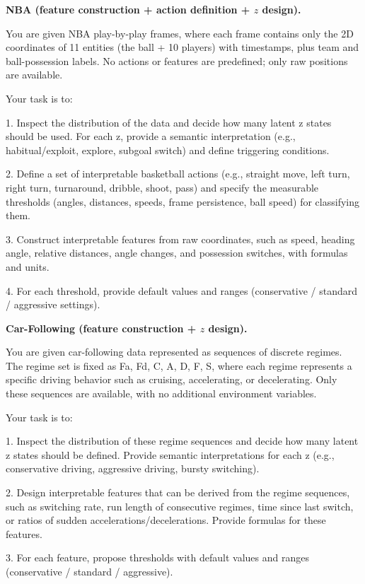 \documentclass{article} %
\begin{document}
\noindent\textbf{NBA (feature construction + action definition + $z$ design).}\\[-0.3em]
\begin{PromptBox}
You are given NBA play-by-play frames, where each frame contains only the 2D
coordinates of 11 entities (the ball + 10 players) with timestamps, plus team and
ball-possession labels. No actions or features are predefined; only raw positions
are available.

Your task is to:

1. Inspect the distribution of the data and decide how many latent z states
   should be used. For each z, provide a semantic interpretation (e.g.,
   habitual/exploit, explore, subgoal switch) and define triggering conditions.

2. Define a set of interpretable basketball actions (e.g., straight move, left turn,
   right turn, turnaround, dribble, shoot, pass) and specify the measurable
   thresholds (angles, distances, speeds, frame persistence, ball speed) for
   classifying them.

3. Construct interpretable features from raw coordinates, such as speed, heading
   angle, relative distances, angle changes, and possession switches, with formulas
   and units.

4. For each threshold, provide default values and ranges
   (conservative / standard / aggressive settings).
\end{PromptBox}

\noindent\textbf{Car-Following (feature construction + $z$ design).}\\[-0.3em]
\begin{PromptBox}
You are given car-following data represented as sequences of discrete regimes.
The regime set is fixed as {Fa, Fd, C, A, D, F, S}, where each regime represents
a specific driving behavior such as cruising, accelerating, or decelerating.
Only these sequences are available, with no additional environment variables.

Your task is to:

1. Inspect the distribution of these regime sequences and decide how many latent
   z states should be defined. Provide semantic interpretations for each z
   (e.g., conservative driving, aggressive driving, bursty switching).

2. Design interpretable features that can be derived from the regime sequences,
   such as switching rate, run length of consecutive regimes, time since last
   switch, or ratios of sudden accelerations/decelerations. Provide formulas for
   these features.

3. For each feature, propose thresholds with default values and ranges
   (conservative / standard / aggressive).
\end{PromptBox}
\end{document}
